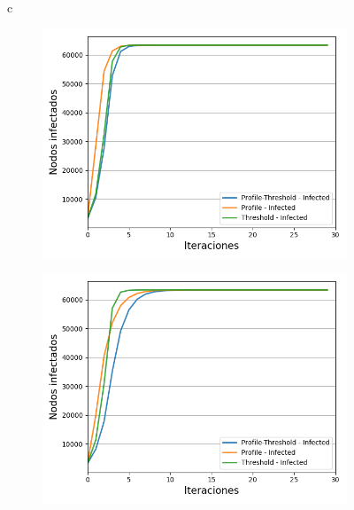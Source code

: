 \documentclass{article}
\begin{document}
\begin{figure}{c}
	\label{fig:plot4}
	\begin{subfigure}[b]{0.5\textwidth}
		\includegraphics[width=\textwidth]{../Images/Fig 4 a).png}
		\caption{}
		\label{fig:f41}
	\end{subfigure}
	\hfill
	\begin{subfigure}[b]{0.5\textwidth}
		\includegraphics[width=\textwidth]{../Images/Fig 4 b).png}
		\caption{}
		\label{fig:f42}
	\end{subfigure}
	\begin{subfigure}[b]{0.5\textwidth}

\end{subfigure}
\end{figure}
\end{document}

